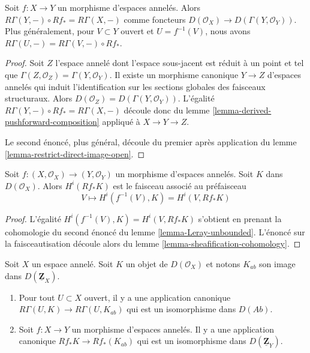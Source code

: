 {\begin{lemma}

\label{lemma-Leray-unbounded}
Soit $f : X \to Y$ un morphisme d'espaces annelés. Alors $R\Gamma(Y, -) \circ Rf_* = R\Gamma(X, -)$ comme foncteurs $D(\mathcal{O}_X) \to D(\Gamma(Y, \mathcal{O}_Y))$. Plus généralement, pour $V \subset Y$ ouvert et $U = f^{-1}(V)$, nous avons $R\Gamma(U, -) = R\Gamma(V, -) \circ Rf_*$.
\end{lemma}

\begin{proof}
Soit $Z$ l'espace annelé dont l'espace sous-jacent est réduit à un point et tel que $\Gamma(Z, \mathcal{O}_Z) = \Gamma(Y, \mathcal{O}_Y)$. Il existe un morphisme canonique $Y \to Z$ d'espaces annelés qui induit l'identification sur les sections globales des faisceaux structuraux. Alors $D(\mathcal{O}_Z) = D(\Gamma(Y, \mathcal{O}_Y))$. L'égalité $R\Gamma(Y, -) \circ Rf_* = R\Gamma(X, -)$ découle donc du lemme \ref{lemma-derived-pushforward-composition} appliqué à $X \to Y \to Z$.

\medskip\noindent

Le second énoncé, plus général, découle du premier après application du lemme \ref{lemma-restrict-direct-image-open}.

\end{proof}

\begin{lemma}

\label{lemma-unbounded-describe-higher-direct-images}
Soit $f : (X, \mathcal{O}_X) \to (Y, \mathcal{O}_Y)$ un morphisme d'espaces annelés. Soit $K$ dans $D(\mathcal{O}_X)$. Alors $H^i(Rf_*K)$ est le faisceau associé au préfaisceau $$
V \mapsto H^i(f^{-1}(V), K) = H^i(V, Rf_*K)
$$
\end{lemma}

\begin{proof}
L'égalité $H^i(f^{-1}(V), K) = H^i(V, Rf_*K)$ s'obtient en prenant la cohomologie du second énoncé du lemme \ref{lemma-Leray-unbounded}. L'énoncé sur la faisceautisation découle alors du lemme \ref{lemma-sheafification-cohomology}.
\end{proof}

\begin{lemma}

\label{lemma-modules-abelian-unbounded}
Soit $X$ un espace annelé. Soit $K$ un objet de $D(\mathcal{O}_X)$ et notons $K_{ab}$ son image dans $D(\underline{\mathbf{Z}}_X)$.
\begin{enumerate}
\item Pour tout $U \subset X$ ouvert, il y a une application canonique $R\Gamma(U, K) \to R\Gamma(U, K_{ab})$ qui est un isomorphisme dans $D(\textit{Ab})$.
\item Soit $f : X \to Y$ un morphisme d'espaces annelés. Il y a une application canonique $Rf_*K \to Rf_*(K_{ab})$ qui est un isomorphisme dans $D(\underline{\mathbf{Z}}_Y)$.
\end{enumerate}


\end{lemma}}
